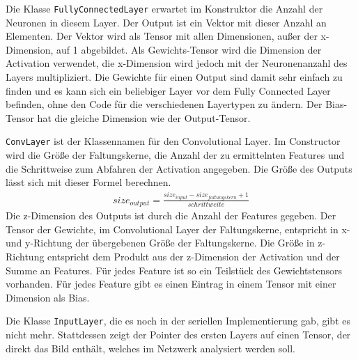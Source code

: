 \documentclass[../main.tex]{subfiles}
\begin{document}
Die Klasse \texttt{FullyConnectedLayer} erwartet im Konstruktor die Anzahl der Neuronen in diesem Layer. Der Output ist ein Vektor mit dieser Anzahl an Elementen. Der Vektor wird als Tensor mit allen Dimensionen, außer der x-Dimension, auf 1 abgebildet. Als Gewichts-Tensor wird die Dimension der Activation verwendet, die x-Dimension wird jedoch mit der Neuronenanzahl des Layers multipliziert. Die Gewichte für einen Output sind damit sehr einfach zu finden und es kann sich ein beliebiger Layer vor dem Fully Connected Layer befinden, ohne den Code für die verschiedenen Layertypen zu ändern. Der Bias-Tensor hat die gleiche Dimension wie der Output-Tensor.

\texttt{ConvLayer} ist der Klassennamen für den Convolutional Layer. Im Constructor wird die Größe der Faltungskerne, die Anzahl der zu ermittelnten Features und die Schrittweise zum Abfahren der Activation angegeben. Die Größe des Outputs lässt sich mit dieser Formel berechnen.
\begin{equation}\label{eq:cnn_outout_size}
\begin{split}
size_{output} = \frac{size_{input} -size_{faltungskern} +1}{schrittweite}
\end{split}
\end{equation}
Die z-Dimension des Outputs ist durch die Anzahl der Features gegeben. Der Tensor der Gewichte, im Convolutional Layer der Faltungskerne, entspricht in x- und y-Richtung der übergebenen Größe der Faltungskerne. Die Größe in z-Richtung entspricht dem Produkt aus der z-Dimension der Activation und der Summe an Features. Für jedes Feature ist so ein Teilstück des Gewichtstensors vorhanden. Für jedes Feature gibt es einen Eintrag in einem Tensor mit einer Dimension als Bias.

Die Klasse \texttt{InputLayer}, die es noch in der seriellen Implementierung gab, gibt es nicht mehr. Stattdessen zeigt der Pointer des ersten Layers auf einen Tensor, der direkt das Bild enthält, welches im Netzwerk analysiert werden soll.
\end{document}
